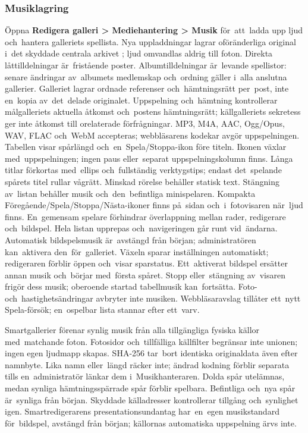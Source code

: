 \documentclass[11pt,a4paper]{article}
\newcommand{\filepath}[1]{\path{#1}}
\newcommand{\ui}[1]{\textbf{#1}}
\begin{document}
\subsubsection{Musiklagring}

Öppna \ui{Redigera galleri > Mediehantering > Musik} för~att~ladda upp ljud
och~hantera
galleriets spellista. Nya uppladdningar lagrar oföränderliga original i~det
skyddade centrala arkivet \filepath{data/music/}; ljud omvandlas aldrig till
foton.
Direkta låttilldelningar är~fristående poster. Albumtilldelningar är~levande
spellistor: senare ändringar av~albumets medlemskap och~ordning gäller i~alla
anslutna gallerier. Galleriet lagrar ordnade referenser och~hämtningsrätt
per~post,
inte en~kopia av~det~delade originalet. Uppspelning och~hämtning kontrollerar
målgalleriets aktuella åtkomst och~postens hämtningsrätt; källgalleriets
sekretess
ger inte åtkomst till orelaterade förfrågningar. MP3, M4A, AAC, Ogg/Opus, WAV,
FLAC
och~WebM accepteras; webbläsarens kodekar avgör uppspelningen.
Tabellen visar spårlängd och~en~Spela/Stoppa-ikon före titeln. Ikonen
växlar med~uppspelningen; ingen paus eller~separat uppspelningskolumn finns.
Långa titlar förkortas med~ellips och~fullständig verktygstips; endast
det~spelande spårets titel rullar vågrätt. Minskad rörelse behåller statisk
text. Stängning av~listan behåller musik och~den~befintliga minispelaren.
Kompakta
Föregående/Spela/Stoppa/Nästa-ikoner finns på~sidan och~i~fotovisaren när~ljud
finns. En~gemensam spelare förhindrar överlappning mellan rader, redigerare
och~bildspel. Hela listan upprepas och~navigeringen går runt vid~ändarna.
Automatisk bildspelsmusik är~avstängd från början; administratören kan~aktivera
den~för~galleriet. Växeln sparar inställningen automatiskt; redigeraren förblir
öppen och~visar sparstatus. Ett~aktiverat bildspel ersätter annan musik
och~börjar
med~första spåret. Stopp eller~stängning av~visaren frigör dess musik;
oberoende startad tabellmusik kan~fortsätta. Foto- och~hastighetsändringar
avbryter inte musiken. Webbläsaravslag tillåter ett~nytt Spela-försök;
en~ospelbar lista stannar efter ett~varv.

Smartgallerier förenar synlig musik från alla tillgängliga fysiska källor
med~matchande foton. Fotosidor och~tillfälliga källfilter begränsar inte
unionen; ingen egen ljudmapp skapas. SHA-256 tar~bort identiska originaldata
även efter namnbyte. Lika namn eller~längd räcker inte; ändrad kodning
förblir separata tills en~administratör länkar dem i~Musikhanteraren.
Dolda spår utelämnas,
medan synliga hämtningsspärrade spår förblir spelbara. Befintliga och~nya
spår är~synliga från början. Skyddade källadresser kontrollerar tillgång
och~synlighet igen. Smartredigerarens presentationsundantag har~en~egen
musikstandard för~bildspel, avstängd från början; källornas automatiska
uppspelning ärvs inte.
\end{document}
